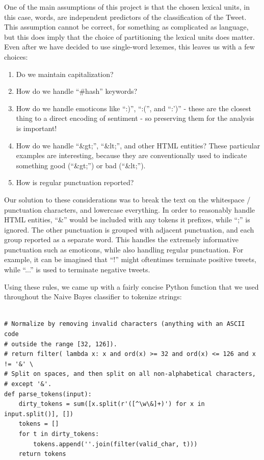 \documentclass[12pt,a4paper]{article}
\begin{document}
One of the main assumptions of this project is that the chosen lexical units, in this case, words, are independent predictors of the classification of the Tweet.  This assumption cannot be correct, for something as complicated as language, but this does imply that the choice of partitioning the lexical units does matter.  Even after we have decided to use single-word lexemes, this leaves us with a few choices:

\begin{enumerate}[1)]
\item Do we maintain capitalization?
\item How do we handle ``\#hash'' keywords?
\item How do we handle emoticons like ``:)'', ``:('', and ``:')'' - these are the closest thing to a direct encoding of sentiment - so preserving them for the analysis is important!
\item How do we handle ``\&gt;'', ``\&lt;'', and other HTML entities?  These particular examples are interesting, because they are conventionally used to indicate something good (``\&gt;'') or bad (``\&lt;'').
\item How is regular punctuation reported?
\end{enumerate}

Our solution to these considerations was to break the text on the whitespace / punctuation characters, and lowercase everything.  In order to reasonably handle HTML entities, ``\&'' would be included with any tokens it prefixes, while ``;'' is ignored.  The other punctuation is grouped with adjacent punctuation, and each group reported as a separate word.  This handles the extremely informative punctuation such as emoticons, while also handling regular punctuation.  For example, it can be imagined that ``!'' might oftentimes terminate positive tweets, while ``...'' is used to terminate negative tweets.

Using these rules, we came up with a fairly concise Python function that we used throughout the Naive Bayes classifier to tokenize strings:

\begin{verbatim}

# Normalize by removing invalid characters (anything with an ASCII code
# outside the range [32, 126]).
# return filter( lambda x: x and ord(x) >= 32 and ord(x) <= 126 and x != '&' \
# Split on spaces, and then split on all non-alphabetical characters,
# except '&'.
def parse_tokens(input):
    dirty_tokens = sum([x.split(r'([^\w\&]+)') for x in input.split()], [])
    tokens = []
    for t in dirty_tokens:
        tokens.append(''.join(filter(valid_char, t)))
    return tokens

\end{verbatim}
\end{document}
